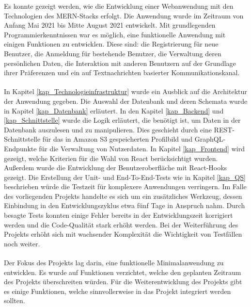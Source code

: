 Es konnte gezeigt werden, wie die Entwicklung einer Webanwendung mit den Technologien des MERN-Stacks erfolgt.
Die Anwendung wurde im Zeitraum von Anfang Mai 2021 bis Mitte August 2021 entwickelt.
Mit grundlegenden Programmierkenntnissen war es möglich, eine funktionelle Anwendung mit einigen Funktionen zu entwicklen.
Diese sind: die Registrierung für neue Benutzer, die Anmeldung für bestehende Benutzer, die Verwaltung deren persönlichen Daten, die Interaktion mit anderen Benutzern auf der Grundlage ihrer Präferenzen und ein auf Textnachrichten basierter Kommunikationskanal.
\\\\
In Kapitel \ref{kap_Technologieinfrastruktur} wurde ein Ausblick auf die Architektur der Anwendung gegeben. %
Die Auswahl der Datenbank und deren Schemata wurde in Kapitel \ref{kap_Datenbank} erläutert.
In den Kapitel \ref{kap_Backend} und \ref{kap_Schnittstelle} wurde die Logik erläutert, die benötigt ist, um Daten in der Datenbank auszulesen und zu manipulieren.
Dies geschieht durch eine REST-Schnittstelle für das in Amazon S3 gespeicherten Profilbild und GraphQL-Endpunkte für die Verwaltung von Nutzerdaten. 
In Kapitel \ref{kap_Frontend} wird gezeigt, welche Kriterien für die Wahl von React berücksichtigt wurden. 
Außerdem wurde die Entwicklung der Benutzeroberfläche mit React-Hooks gezeigt. 
Die Erstellung der Unit- und End-To-End-Tests wie in Kapitel \ref{kap_QS} beschrieben würde die Testzeit für komplexere Anwendungen verringern.
Im Falle des vorliegenden Projekts handelte es sich um ein zusätzliches Werkzeug, dessen Einbindung in den Entwicklungszyklus etwa fünf Tage in Anspruch nahm.
Durch besagte Tests konnten einige Fehler bereits in der Entwicklungszeit korrigiert werden und die Code-Qualität stark erhöht werden.
Bei der Weiterführung des Projekts erhöht sich mit wachsender Komplexität die Wichtigkeit von Testfällen noch weiter.
\\\\
Der Fokus des Projekts lag darin, eine funktionelle Minimalanwendung zu entwicklen. Es wurde auf Funktionen verzichtet, welche den geplanten Zeitraum des Projekts überschreiten würden.
Für die Weiterentwicklung des Projekts gibt es einige Funktionen, welche sinnvollerweise in das Projekt integriert werden sollten.
